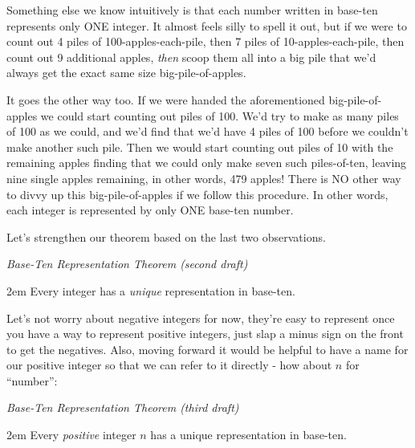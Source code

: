 \documentclass{article}
\newenvironment{jprIn}{\begin{adjustwidth}{2em}{}}{\end{adjustwidth}}
\begin{document}
Something else we know intuitively is that each number written
in base-ten represents only ONE integer.
It almost feels silly to spell it out, but if we were to count out
4 piles of 100-apples-each-pile, then 7 piles of 10-apples-each-pile,
then count out 9 additional apples, \emph{then}
scoop them all into a big pile that
we'd always get the exact same size big-pile-of-apples.

It goes the other way too. If we were handed the aforementioned
big-pile-of-apples we could start counting out
piles of 100. We'd try to make as many piles of 100 as we could,
and we'd find that we'd have 4 piles of 100 before
we couldn't make another such pile.
Then we would start counting out piles of 10 with the remaining apples finding
that we could only make seven such piles-of-ten, leaving nine single apples remaining,
in other words, 479 apples! There is NO other
way to divvy up this big-pile-of-apples
if we follow this procedure.  In other words, each integer is
represented by only ONE base-ten number.

Let's strengthen our theorem based on the last two observations.

\emph{Base-Ten Representation Theorem (second draft)}
\begin{jprIn}
Every integer has a \emph{unique} representation in base-ten.
\end{jprIn}


Let's not worry about negative integers for now,
they're easy to represent once you have a way to represent
positive integers, just slap a minus sign on the front to get the negatives.
Also, moving forward it would be helpful to have a name for our 
positive integer so that we can refer to it directly - how about $n$ for ``number'':

\emph{Base-Ten Representation Theorem (third draft)}
\begin{jprIn}
Every \emph{positive} integer $n$ has a unique representation in base-ten.
\end{jprIn}
\end{document}
